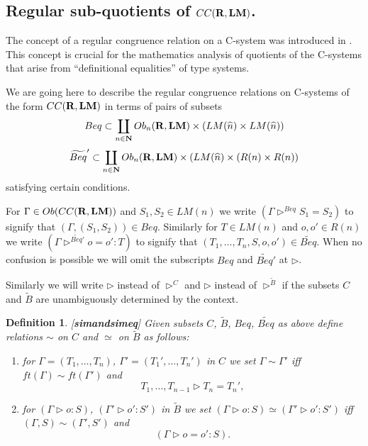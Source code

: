 \documentclass[11pt]{article}
\newtheorem{definition}[proposition]{Definition}
\newcommand{\llabel}[1]{\label{#1}[{\bf #1}]}
\newcommand{\nn}{{\bf N\rm}}
\newcommand{\nat}{\nn}
\newcommand{\rr}{{\bf R}}
\newcommand{\lm}{{\bf LM}}
\newcommand{\wt}{\widetilde}
\newcommand{\wh}{\widehat}
\begin{document}
\subsection{Regular sub-quotients of $CC(\rr,\lm)$.} 
%
The concept of a regular congruence relation on a C-system was introduced in \cite[Section 5]{Csubsystems}. This concept is crucial for the mathematics analysis of quotients of the C-systems that arise from ``definitional equalities'' of type systems.

We are going here to describe the regular congruence  relations  on C-systems of the form $CC(\rr,\lm)$ in terms of pairs of subsets 
%
$$Beq\subset \coprod_{n\in\nat}  Ob_n(\rr,\lm)\times (LM(\wh{n})\times LM(\wh{n}))$$
$$\wt{Beq}'\subset \coprod_{n\in\nat}  Ob_n(\rr,\lm)\times (LM(\wh{n})\times (R(n)\times R(n))$$
%
satisfying certain conditions. 

For $\Gamma\in Ob(CC(\rr,\lm))$ and $S_1,S_2\in LM(n)$ we write $(\Gamma\rhd^{Beq} S_1=S_2)$ to signify that $(\Gamma,(S_1,S_2))\in Beq$. Similarly for $T\in LM(n)$ and $o,o'\in R(n)$ we write $(\Gamma\rhd^{\wt{Beq}'} o=o':T)$ to signify that $(T_1,\dots,T_n,S,o,o')\in \wt{Beq}$.  When no confusion is possible we will omit the subscripts $Beq$ and $\wt{Beq}'$ at $\rhd$. 

Similarly we will write $\rhd$ instead of $\rhd^C$ and $\rhd$ instead of $\rhd^{\wt{B}}$ if the subsets $C$ and $\wt{B}$ are unambiguously  determined by the context.  

%
\begin{definition}
\llabel{simandsimeq}
Given subsets $C$, $\wt{B}$, $Beq$, $\wt{Beq}$ as above define relations $\sim$ on $C$ and $\simeq$ on $\wt{B}$ as follows:
%
\begin{enumerate}
\item for $\Gamma=(T_1,\dots,T_n)$, $\Gamma'=(T_1',\dots,T_n')$ in $C$ we set  $\Gamma\sim\Gamma'$ iff $ft(\Gamma)\sim ft(\Gamma')$ and 
%
$$T_1,\dots,T_{n-1}\rhd T_n=T_n',$$
\item for $(\Gamma\rhd o:S)$, $(\Gamma'\rhd o':S')$ in $\wt{B}$ we set $(\Gamma\rhd o:S)\simeq(\Gamma'\rhd o':S')$ iff $(\Gamma,S)\sim(\Gamma',S')$ and 
%
$$(\Gamma\rhd o=o':S).$$
\end{enumerate}
\end{definition}
%
\end{document}
